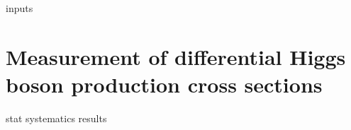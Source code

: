 {inputs}

\section{Measurement of differential Higgs boson production cross sections}


{stat}
{systematics}
{results}
